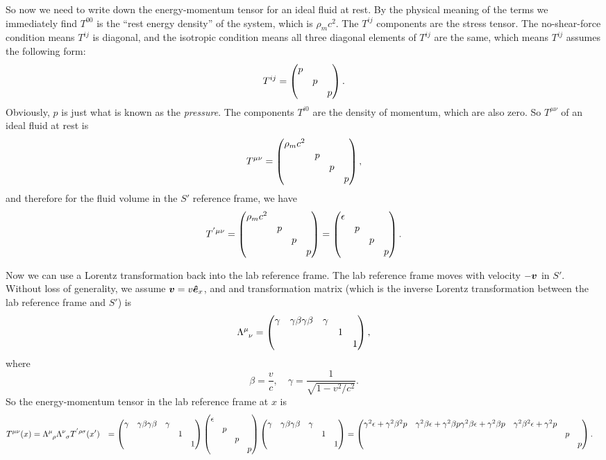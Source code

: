 \documentclass[hyperref, a4paper]{article}
\def\\{}%
\begin{document}
So now we need to write down the energy-momentum tensor for an ideal fluid at rest. By the physical meaning of 
the terms we immediately find $T^{00}$ is the ``rest energy density'' of the system, which is $\rho_m c^2$.
The $T^{ij}$ components are the stress tensor. The no-shear-force condition means $T^{ij}$ is diagonal, and the 
isotropic condition means all three diagonal elements of $T^{ij}$ are the same, which means $T^{ij}$ assumes 
the following form:
\begin{equation}
    T^{ij} = \pmqty{\dmat{p, p, p}}.
\end{equation}
Obviously, $p$ is just what is known as the \emph{pressure}. The components $T^{i0}$ are the density of momentum,
which are also zero. So $T^{\mu \nu}$ of an ideal fluid at rest is 
\begin{equation}
    T^{\mu \nu} = \pmqty{\dmat{\rho_m c^2, p, p, p}},
\end{equation}
and therefore for the fluid volume in the $S'$ reference frame, we have 
\begin{equation}
    T^{' \mu \nu} = \pmqty{\dmat{\rho_m c^2, p, p, p}} = \pmqty{\dmat{\epsilon, p, p, p}} .
\end{equation}

Now we can use a Lorentz transformation back into the lab reference frame. The lab reference frame moves with 
velocity $- \vb*{v}$ in $S'$. Without loss of generality, we assume $\vb*{v} = v \vu*{e}_x$, and and transformation
matrix (which is the inverse Lorentz transformation between the lab reference frame and $S'$) is 
\begin{equation}
    \Lambda\indices{^\mu_\nu} = \pmqty{\dmat{\gamma & \gamma \beta \\ \gamma \beta & \gamma, 1, 1}},
\end{equation}
where 
\begin{equation}
    \beta = \frac{v}{c}, \quad \gamma = \frac{1}{\sqrt{1 - v^2 / c^2}}.
\end{equation}
So the energy-momentum tensor in the lab reference frame at $x$ is 
\begin{equation}
    \begin{aligned}
        T^{\mu \nu}(x) &= \Lambda\indices{^\mu_\rho} \Lambda\indices{^\nu_\sigma} T^{' \rho \sigma}(x') \\
        &= \pmqty{\dmat{\gamma & \gamma \beta \\ \gamma \beta & \gamma, 1, 1}} \pmqty{\dmat{\epsilon, p, p, p}} \pmqty{\dmat{\gamma & \gamma \beta \\ \gamma \beta & \gamma, 1, 1}} \\
        &= \pmqty{\dmat{ \gamma^2 \epsilon + \gamma^2 \beta^2 p & \gamma^2 \beta \epsilon + \gamma^2 \beta p \\ \gamma^2 \beta \epsilon + \gamma^2 \beta p & \gamma^2 \beta^2 \epsilon + \gamma^2 p , p, p}}.
    \end{aligned}
    \label{eq:t-in-beta-gamma}
\end{equation} 
\end{document}
